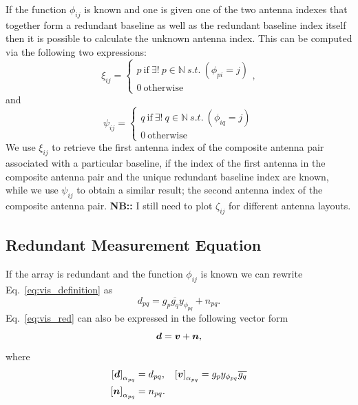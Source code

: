 \documentclass[useAMS,usenatbib]{mn2e}
\newcommand{\bd}{\bmath{d}}
\newcommand{\bv}{\bmath{v}}
\newcommand{\bn}{\bmath{n}}
\newcommand{\conj}[1]{\overline{#1}}
\begin{document}
If the function $\phi_{ij}$ is known and one is given one of the two antenna indexes that together form a redundant baseline as well as the redundant baseline index itself then it is possible 
to calculate the unknown antenna index. This can be computed via the following two expressions:
\begin{equation}
\xi_{ij} = 
\begin{cases}
p~\textrm{if}~\exists! ~ p \in \mathbb{N} ~ s.t. ~(\phi_{pi} = j)\\
0~\textrm{otherwise}
\end{cases},
\end{equation}
and
\begin{equation}
\psi_{ij} = 
\begin{cases}
q~\textrm{if}~\exists! ~ q \in \mathbb{N} ~ s.t. ~(\phi_{iq} = j)\\
0~\textrm{otherwise}
\end{cases}
\end{equation}
We use $\xi_{ij}$ to retrieve the first antenna index of the composite antenna pair associated with a particular baseline, if the index of the first antenna in the composite antenna pair and the unique redundant baseline index are known, while we use $\psi_{ij}$ to obtain 
a similar result; the second antenna index of the composite antenna pair. \textbf{NB::} I still need to plot $\zeta_{ij}$ for different antenna layouts.

\subsection{Redundant Measurement Equation}
If the array is redundant and the function $\phi_{ij}$ is known we can rewrite Eq.~\eqref{eq:vis_definition} as
\begin{equation}
\label{eq:vis_red}
d_{pq} = g_{p}\conj{g_q}y_{\phi_{pq}} + n_{pq}.
\end{equation}
Eq.~\eqref{eq:vis_red} can also be expressed in the following vector form 
\begin{equation}
\label{eq:vis_red_vec}
\bd = \bv + \bn, 
\end{equation}
where 
\begin{align}
 \left [ \bd \right]_{\alpha_{pq}} &= d_{pq}, & \left [ \bv \right ]_{\alpha_{pq}} &= g_p y_{\phi_{pq}} \conj{g_q}\nonumber\\
 \left [ \bn \right ]_{\alpha_{pq}} &= n_{pq}. &  &\label{eq:vec_definitions}
\end{align}
\end{document}

